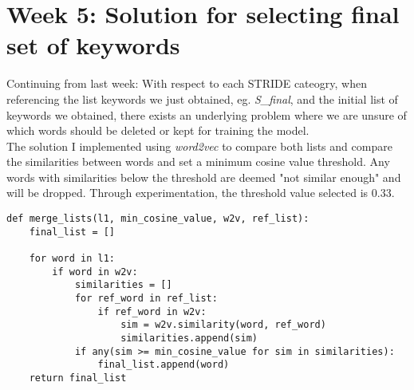 \section*{Week 5: Solution for selecting final set of keywords}

Continuing from last week: With respect to each STRIDE cateogry, when referencing the list keywords we just obtained, eg. \textit{S\_final}, and the initial list of keywords we obtained, there exists an underlying problem where we are unsure of which words should be deleted or kept for training the model.\\
The solution I implemented using \textit{word2vec} to compare both lists and compare the similarities between words and set a minimum cosine value threshold. Any words with similarities below the threshold are deemed "not similar enough" and will be dropped. Through experimentation, the threshold value selected is 0.33.\\

\begin{lstlisting}[frame=single]
def merge_lists(l1, min_cosine_value, w2v, ref_list):
    final_list = []

    for word in l1:
        if word in w2v:
            similarities = []
            for ref_word in ref_list:
                if ref_word in w2v:
                    sim = w2v.similarity(word, ref_word)
                    similarities.append(sim)
            if any(sim >= min_cosine_value for sim in similarities):
                final_list.append(word)
    return final_list
\end{lstlisting}

